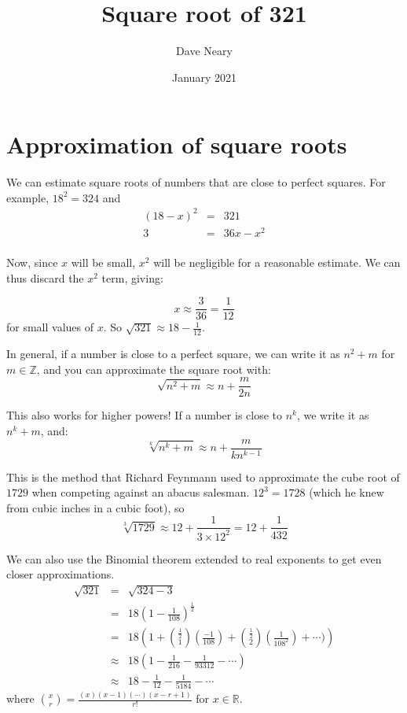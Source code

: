 \documentclass{article}
\title{Square root of 321}
\author{Dave Neary}
\date{January 2021}
\begin{document}
\section{Approximation of square roots}

We can estimate square roots of numbers that are close to perfect squares. For example, $18^2 = 324$
and
\begin{eqnarray*}
(18-x)^2& =& 321\\
3 &=& 36x - x^2 \\
\end{eqnarray*}

Now, since $x$ will be small, $x^2$ will be negligible for a reasonable estimate. We can thus
discard the $x^2$ term, giving:

\[ x \approx \frac{3}{36} = \frac{1}{12}\]
for small values of $x$. So $\sqrt{321} \approx 18 - \frac{1}{12}$.

In general, if a number is close to a perfect square, we can write it as $n^2 + m$ for
$m\in \mathbb{Z}$, and you can approximate the square root with:
\[\sqrt{n^2+m} \approx n+\frac{m}{2n}\]

This also works for higher powers! If a number is close to $n^k$, we write it as $n^k+m$, and:
\[ \sqrt[k]{n^k+m} \approx n+\frac{m}{kn^{k-1}} \]

This is the method that Richard Feynmann used to approximate the cube root of $1729$ when
competing against an abacus salesman. $12^3 = 1728$ (which he knew from cubic inches in a cubic foot), so
\[ \sqrt[3]{1729} \approx 12 + \frac{1}{3\times12^2} = 12+\frac{1}{432} \]

We can also use the Binomial theorem extended to real exponents to get even closer approximations.
\begin{eqnarray*}
 \sqrt{321}& =& \sqrt{324 - 3} \\
& = & 18 \left(1-\frac{1}{108}\right)^{\frac{1}{2}} \\
& = &18 \left( 1 + \binom{\frac{1}{2}}{1}\left(\frac{-1}{108}\right) + \binom{\frac{1}{2}}{2}\left(\frac{1}{108^2}\right) + \cdots ) \right) \\
& \approx & 18 \left(1 - \frac{1}{216} - \frac{1}{93312} - \cdots\right) \\
& \approx & 18 - \frac{1}{12} - \frac{1}{5184} - \cdots
\end{eqnarray*}
where $\binom{x}{r} = \frac{(x)(x-1)(\cdots)(x-r+1)}{r!}$ for $x \in \mathbb{R}$.

 
\end{document}
